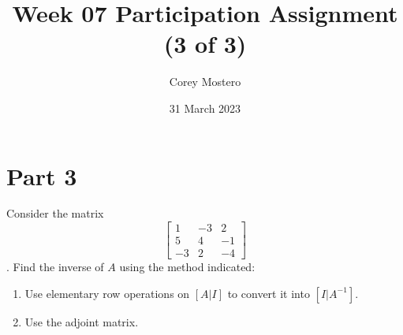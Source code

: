 \documentclass{article}
\title{Week 07 Participation Assignment (3 of 3)}
\author{Corey Mostero}
\date{31 March 2023}
\begin{document}
\newcommand{\hr}{\par\noindent\rule{\textwidth}{0.4pt}}

\newcommand{\bc}[1]{
	\begin{equation*}
		\begin{boxed}
			{#1}
		\end{boxed}
	\end{equation*}
}

\newcommand{\cond}[2]{
	\ifmmode
		{#1} \quad {#2}
	\else
		$$ {#1} \quad {#2} $$
	\fi
}

\maketitle
\newpage

\tableofcontents

\section{Part 3}
Consider the matrix
$$
	\begin{bmatrix}
		1 & -3 & 2 \\
		5 & 4 & -1 \\
		-3 & 2 & -4
	\end{bmatrix}
$$
. Find the inverse of $ A $ using the method indicated:
\begin{enumerate}[label=\textbf{\arabic*)}]
	\item Use elementary row operations on $ [A|I] $ to convert it into $ [I|A^{-1}] $.
	\item Use the adjoint matrix.
\end{enumerate}
\end{document}
